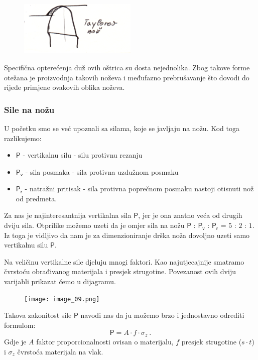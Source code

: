 \documentclass[a4paper,12pt]{article}
\numberwithin{figure}{section}
\begin{document}
\begin{figure}[!h]
\includegraphics[width=0.5\textwidth]{image_08-2.png}
\end{figure}
\FloatBarrier
\noindent Specifična opterećenja duž ovih oštrica su dosta nejednolika. Zbog takove forme otežana je proizvodnja takovih noževa i međufazno prebrušavanje što dovodi do rijeđe primjene ovakovih oblika noževa. 
\subsubsection*{Sile na nožu}
U početku smo se već upoznali sa silama, koje se javljaju na nožu. Kod toga razlikujemo:
\begin{itemize}
\item $\mathsf{P}$ - vertikalnu silu - silu protivnu rezanju
\item $\mathsf{P_{v}}$ - sila posmaka - sila protivna uzdužnom posmaku
\item $\mathsf{P_{r}}$ - natražni pritisak - sila protivna poprečnom posmaku nastoji otisnuti nož od predmeta.
\end{itemize}
\par
Za nas je najinteresantnija vertikalna sila $\mathsf{P}$, jer je ona znatno veća od drugih dviju sila. Otprilike možemo uzeti da je omjer sila na nožu $\mathsf{P}$ : $\mathsf{P_{v}}$ : $\mathsf{P_{r}}$ = $5$ : $2$ : $1$. Iz toga je vidljivo da nam je za dimenzioniranje drška noža dovoljno uzeti samo vertikalnu silu $\mathsf{P}$. \par
Na veličinu vertikalne sile djeluju mnogi faktori. Kao najutjecajnije smatramo čvrstoću obrađivanog materijala i presjek strugotine. Povezanost ovih dviju varijabli prikazat ćemo u dijagramu.
\begin{figure}[!h]
\texttt{[image: image\_09.png]}
\end{figure}
\FloatBarrier
Takova zakonitost sile $\mathsf{P}$ navodi nas da ju možemo brzo i jednostavno odrediti formulom:
\begin{equation*}
\mathsf{P} = A \cdot f \cdot \sigma_{z}\:.
\end{equation*}
Gdje je $A$ faktor proporcionalnosti ovisan o materijalu, $f$ presjek strugotine ($s\cdot t$)  i $\sigma_{z}$ čvrstoća materijala na vlak. \par
\end{document}
